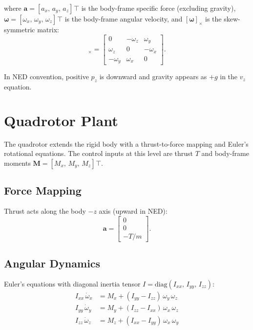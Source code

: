 \documentclass[11pt]{article}
\newcommand{\skew}[1]{[#1]_\times}
\newcommand{\der}[1]{\dot{#1}}
\newcommand{\T}{\!\top}
\begin{document}
where $\bm{a} = [a_x,\, a_y,\, a_z]^\T$ is the body-frame specific
force (excluding gravity), $\bm{\omega} = [\omega_x,\, \omega_y,\,
\omega_z]^\T$ is the body-frame angular velocity, and
$\skew{\bm{\omega}}$ is the skew-symmetric matrix:
\begin{equation}
  \skew{\bm{\omega}} =
  \begin{bmatrix}
    0 & -\omega_z & \omega_y \\
    \omega_z & 0 & -\omega_x \\
    -\omega_y & \omega_x & 0
  \end{bmatrix}.
\end{equation}

In NED convention, positive $p_z$ is downward and gravity appears as
$+g$ in the $v_z$ equation.

\section{Quadrotor Plant}

The quadrotor extends the rigid body with a thrust-to-force mapping and
Euler's rotational equations. The control inputs at this level are thrust
$T$ and body-frame moments $\bm{M} = [M_x,\, M_y,\, M_z]^\T$.

\subsection{Force Mapping}

Thrust acts along the body $-z$ axis (upward in NED):
\begin{equation}
  \bm{a} = \begin{bmatrix} 0 \\ 0 \\ -T/m \end{bmatrix}.
\end{equation}

\subsection{Angular Dynamics}

Euler's equations with diagonal inertia tensor
$I = \mathrm{diag}(I_{xx},\, I_{yy},\, I_{zz})$:
\begin{align}
  I_{xx}\,\der{\omega}_x &= M_x + (I_{yy} - I_{zz})\,\omega_y\,\omega_z \\
  I_{yy}\,\der{\omega}_y &= M_y + (I_{zz} - I_{xx})\,\omega_x\,\omega_z \\
  I_{zz}\,\der{\omega}_z &= M_z + (I_{xx} - I_{yy})\,\omega_x\,\omega_y
\end{align}
\end{document}
